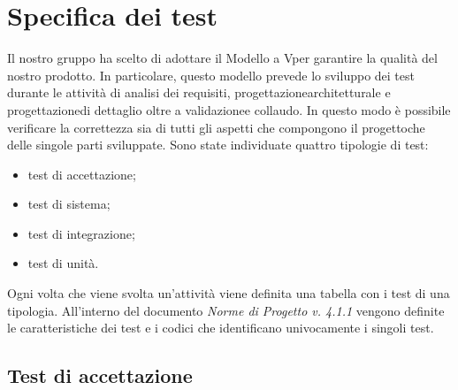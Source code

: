 \section{Specifica dei test}
Il nostro gruppo ha scelto di adottare il Modello a V\glosp per garantire la qualità del nostro prodotto\glo. In particolare, questo modello prevede lo sviluppo dei test durante le attività di analisi dei requisiti, progettazione\glosp architetturale e progettazione\glosp di dettaglio oltre a validazione\glosp e collaudo.
In questo modo è possibile verificare la correttezza sia di tutti gli aspetti che compongono il progetto\glosp che delle singole parti sviluppate. Sono state individuate quattro tipologie di test:
\begin{itemize}
	\item test di accettazione;
	\item test di sistema;
	\item test di integrazione;
	\item test di unità.
\end{itemize}
Ogni volta che viene svolta un'attività viene definita una tabella con i test di una tipologia.
All'interno del documento \textit{Norme di Progetto v. 4.1.1} vengono definite le caratteristiche dei test e i codici che identificano univocamente i singoli test.

\subsection{Test di accettazione}

